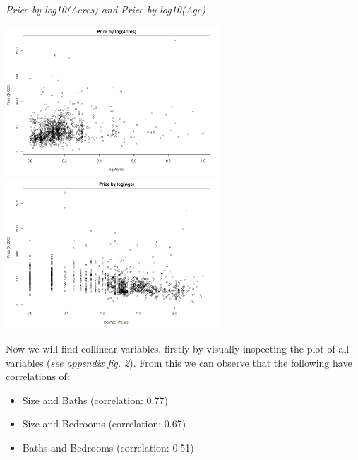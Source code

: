 \documentclass[10pt,A4,makeidx]{article}
\begin{document}
  \emph{Price by log10(Acres) and Price by log10(Age)}\\
  \begin{center}
    \includegraphics[width=8cm]{price-logacres.png}
    \includegraphics[width=8cm]{price-logage.png}
  \end{center}
  
  Now we will find collinear variables, firstly by visually inspecting the plot
  of all variables (\emph{see appendix fig. 2}). From this we can observe that the
  following have correlations of:
  \begin{itemize}
    \item Size and Baths (correlation: 0.77)
    \item Size and Bedrooms (correlation: 0.67)
    \item Baths and Bedrooms (correlation: 0.51)
  \end{itemize}
  
\end{document}
